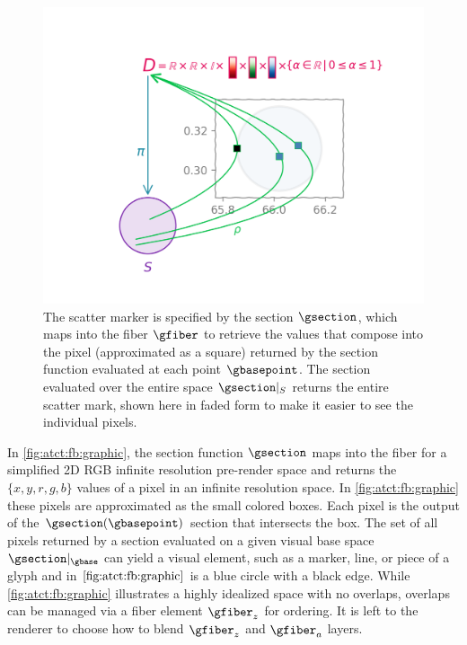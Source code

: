 \documentclass[journal]{IEEEtran}
\theoremstyle{definition}
\theoremstyle{remark}
\begin{document}
\begin{figure}[H]
  \includegraphics[width=1\columnwidth]{fb_rho.png}
  \caption{The scatter marker is specified by the section $\gsection$, which maps into the fiber $\gfiber$ to retrieve the values that compose into the pixel (approximated as a square) returned by the section function evaluated at each point $\gbasepoint$. The section evaluated over the entire space $\gsection\vert_{S}$ returns the entire scatter mark, shown here in faded form to make it easier to see the individual pixels.
  \label{fig:atct:fb:graphic}}
\end{figure}

In \autoref{fig:atct:fb:graphic}, the section function $\gsection$ maps into the fiber for a simplified 2D RGB infinite resolution pre-render space and returns the $\{x,y,r,g,b\}$ values of a pixel in an infinite resolution space. In \autoref{fig:atct:fb:graphic} these pixels are approximated as the small colored boxes. Each pixel is the output of the $\gsection(\gbasepoint)$ section that intersects the box. The set of all pixels returned by a section evaluated on a given visual base space $\gsection|_{\gbase}$ can yield a visual element, such as a marker, line, or piece of a glyph and in $\autoref{fig:atct:fb:graphic}$ is a blue circle with a black edge. While \autoref{fig:atct:fb:graphic} illustrates a highly idealized space with no overlaps, overlaps can be managed via a fiber element $\gfiber_{z}$ for ordering. It is left to the renderer to choose how to blend $\gfiber_{z}$ and $\gfiber_{a}$ layers.
\end{document}

